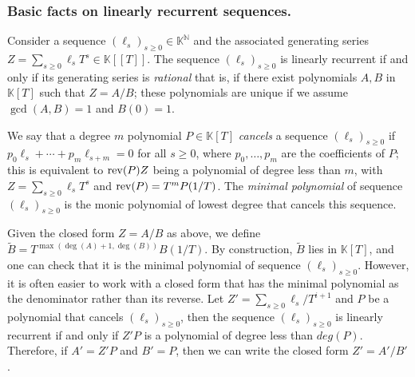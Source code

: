 \documentclass[12pt]{article}
\def\N {\ensuremath{\mathbb{N}}}
\def\K {\ensuremath{\mathbb{K}}}
\def\K{\mathbb{K}}
\begin{document}
\subsubsection{Basic facts on linearly recurrent sequences.} 
\label{section:linseq}
Consider a sequence $(\ell_s)_{s \ge 0} \in \K^\N$
and the associated generating series $Z=\sum_{s \ge 0} \ell_s T^s \in
\K[[T]]$. The sequence $(\ell_s)_{s \ge 0}$ is {\rm linearly recurrent} if and
only if its generating series is {\em rational} that is, if there
exist polynomials $A,B$ in $\K[T]$ such that $Z=A/B$; these
polynomials are unique if we assume $\gcd(A,B)=1$ and $B(0)=1$. 

We say that a degree $m$ polynomial $P\in\K[T]$ {\em cancels} a
sequence $(\ell_s)_{s \ge 0}$ if $p_0 \ell_s + \cdots + p_m
\ell_{s+m}=0$ for all $s \ge 0$, where $p_0,\dots,p_m$ are the
coefficients of $P$; this is equivalent to ${\rm rev}(P) Z$ being a
polynomial of degree less than $m$, with $Z=\sum_{s \ge 0} \ell_s T^s$
and ${\rm rev}(P)=T^m P(1/T)$. The {\em minimal polynomial} of
sequence $(\ell_s)_{s \ge 0}$ is the monic polynomial of lowest degree
that cancels this sequence. 

Given the closed form $Z =  A/B$ as above, we define $\tilde B =
T^{\max(\deg(A)+1,\deg(B))}B(1/T)$.  By construction, $\tilde B$ lies
in $\K[T]$, and one can check that it is the minimal polynomial of
sequence $(\ell_s)_{s \ge 0}$. However, it is often easier to work with a 
closed form that has the minimal polynomial as the denominator rather than
its reverse. Let $Z' = \sum_{s\ge0} \ell_s / T^{i+1}$ and $P$ be a polynomial
that cancels $(\ell_s)_{s\ge0}$, then the sequence 
$(\ell_s)_{s\ge0}$ is linearly recurrent if and only if $Z'P$ is a polynomial
of degree less than $deg(P)$. Therefore, if $A' = Z'P$ and $B' = P$, then we
can write the closed form $Z' = A'/B'$.
\end{document}
